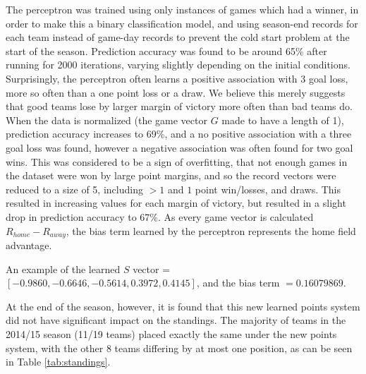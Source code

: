 \documentclass[conference]{IEEEtran}
\begin{document}
The perceptron was trained using only instances of games which had a winner, in order to make this a binary classification model, and using season-end records for each team instead of game-day records to prevent the cold start problem at the start of the season. Prediction accuracy was found to be around 65\% after running for 2000 iterations, varying slightly depending on the initial conditions. Surprisingly, the perceptron often learns a positive association with 3 goal loss, more so often than a one point loss or a draw. We believe this merely suggests that good teams lose by larger margin of victory more often than bad teams do. When the data is normalized (the game vector $G$ made to have a length of 1), prediction accuracy increases to 69\%, and a no positive association with a three goal loss was found, however a negative association was often found for two goal wins. This was considered to be a sign of overfitting, that not enough games in the dataset were won by large point margins, and so the record vectors were reduced to a size of 5, including $>1$ and $1$ point win/losses, and draws. This resulted in increasing values for each margin of victory, but resulted in a slight drop in prediction accuracy to 67\%. As every game vector is calculated $R_{home} - R_{away}$, the bias term learned by the perceptron represents the home field advantage. 

An example of the learned $S$ vector = $[-0.9860, -0.6646, -0.5614,  0.3972,  0.4145]$, and the bias term $=0.16079869$.

At the end of the season, however, it is found that this new learned points system did not have significant impact on the standings. The majority of teams in the 2014/15 season (11/19 teams) placed exactly the same under the new points system, with the other 8 teams differing by at most one position, as can be seen in Table \ref{tab:standings}. 
\end{document}
